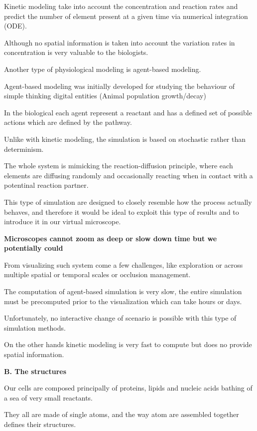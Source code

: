 Kinetic modeling take into account the concentration and reaction rates and predict the number of element present at a given time via numerical integration (ODE).

Although no spatial information is taken into account the variation rates in concentration is very valuable to the biologists.


Another type of physiological modeling is agent-based modeling.

Agent-based modeling was initially developed for studying the behaviour of simple thinking digital entities (Animal population growth/decay)

In the biological each agent represent a reactant and has a defined set of possible actions which are defined by the pathway.

Unlike with kinetic modeling, the simulation is based on stochastic rather than determinism.

The whole system is mimicking the reaction-diffusion principle, where each elements are diffusing randomly and occasionally reacting when in contact with a potentinal reaction partner.



This type of simulation are designed to closely resemble how the process actually behaves, and therefore it would be ideal to exploit this type of results and to introduce it in our virtual microscope.

\textbf{Microscopes cannot zoom as deep or slow down time but we potentially could}

From visualizing such system come a few challenges, like exploration or across multiple spatial or temporal scales or occlusion management.



The computation of agent-based simulation is very slow, the entire simulation must be precomputed prior to the visualization which can take hours or days.

Unfortunately, no interactive change of scenario is possible with this type of simulation methods.

On the other hands kinetic modeling is very fast to compute but does no provide spatial information.




\textbf{B. The structures}

Our cells are composed principally of proteins, lipids and nucleic acids bathing of a sea of very small reactants.

They all are made of single atoms, and the way atom are assembled together defines their structures.

